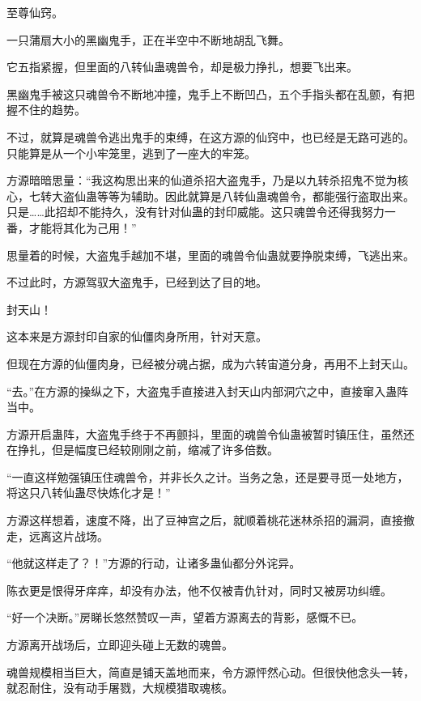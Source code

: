 
\begin{this_body}

至尊仙窍。

一只蒲扇大小的黑幽鬼手，正在半空中不断地胡乱飞舞。

它五指紧握，但里面的八转仙蛊魂兽令，却是极力挣扎，想要飞出来。

黑幽鬼手被这只魂兽令不断地冲撞，鬼手上不断凹凸，五个手指头都在乱颤，有把握不住的趋势。

不过，就算是魂兽令逃出鬼手的束缚，在这方源的仙窍中，也已经是无路可逃的。只能算是从一个小牢笼里，逃到了一座大的牢笼。

方源暗暗思量：“我这构思出来的仙道杀招大盗鬼手，乃是以九转杀招鬼不觉为核心，七转大盗仙蛊等等为辅助。因此就算是八转仙蛊魂兽令，都能强行盗取出来。只是……此招却不能持久，没有针对仙蛊的封印威能。这只魂兽令还得我努力一番，才能将其化为己用！”

思量着的时候，大盗鬼手越加不堪，里面的魂兽令仙蛊就要挣脱束缚，飞逃出来。

不过此时，方源驾驭大盗鬼手，已经到达了目的地。

封天山！

这本来是方源封印自家的仙僵肉身所用，针对天意。

但现在方源的仙僵肉身，已经被分魂占据，成为六转宙道分身，再用不上封天山。

“去。”在方源的操纵之下，大盗鬼手直接进入封天山内部洞穴之中，直接窜入蛊阵当中。

方源开启蛊阵，大盗鬼手终于不再颤抖，里面的魂兽令仙蛊被暂时镇压住，虽然还在挣扎，但是幅度已经较刚刚之前，缩减了许多倍数。

“一直这样勉强镇压住魂兽令，并非长久之计。当务之急，还是要寻觅一处地方，将这只八转仙蛊尽快炼化才是！”

方源这样想着，速度不降，出了豆神宫之后，就顺着桃花迷林杀招的漏洞，直接撤走，远离这片战场。

“他就这样走了？！”方源的行动，让诸多蛊仙都分外诧异。

陈衣更是恨得牙痒痒，却没有办法，他不仅被青仇针对，同时又被房功纠缠。

“好一个决断。”房睇长悠然赞叹一声，望着方源离去的背影，感慨不已。

方源离开战场后，立即迎头碰上无数的魂兽。

魂兽规模相当巨大，简直是铺天盖地而来，令方源怦然心动。但很快他念头一转，就忍耐住，没有动手屠戮，大规模猎取魂核。


\end{this_body}
